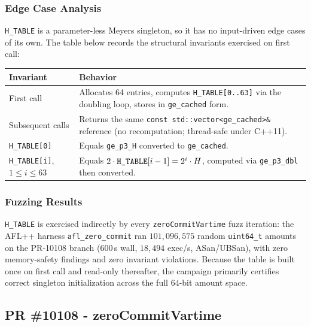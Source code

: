 \documentclass[12pt,titlepage,table]{article}
\begin{document}
\subsubsection{Edge Case Analysis}
\verb+H_TABLE+ is a parameter-less Meyers singleton, so it has no input-driven edge cases of its own.  The table below records the structural invariants exercised on first call:

\begin{table}[htbp]
\centering
{
\begin{tabular}{| p{1.8in} | p{4.3in} |}
\hline
\textbf{Invariant} & \textbf{Behavior} \\
\hline
\hline
First call & Allocates 64 entries, computes \verb+H_TABLE[0..63]+ via the doubling loop, stores in \verb+ge_cached+ form. \\
Subsequent calls & Returns the same \verb+const std::vector<ge_cached>&+ reference (no recomputation; thread-safe under C++11). \\
\verb+H_TABLE[0]+ & Equals \verb+ge_p3_H+ converted to \verb+ge_cached+. \\
\verb+H_TABLE[i]+, $1 \le i \le 63$ & Equals $2 \cdot \verb+H_TABLE+[i-1] = 2^i \cdot H$, computed via \verb+ge_p3_dbl+ then converted. \\
\hline
\end{tabular}}
\end{table}
\subsubsection{Fuzzing Results}
\verb+H_TABLE+ is exercised indirectly by every \verb+zeroCommitVartime+ fuzz iteration: the AFL++ harness \verb+afl_zero_commit+ ran $101{,}096{,}575$ random \verb+uint64_t+ amounts on the PR-10108 branch (600\,s wall, $18{,}494$ exec/s, ASan/UBSan), with zero memory-safety findings and zero invariant violations. Because the table is built once on first call and read-only thereafter, the campaign primarily certifies correct singleton initialization across the full $64$-bit amount space.

\newpage

\subsection{PR \#10108 - zeroCommitVartime}
\end{document}
